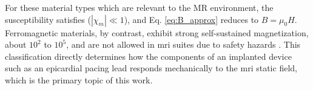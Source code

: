 For these material types which are relevant to the MR environment, the susceptibility satisfies ($|\chi_m| \ll 1$), and Eq. \ref{eq:B_approx} reduces to $B = \mu_0 H$. Ferromagnetic materials, by contrast, exhibit strong self-sustained magnetization, about $10^2$ to $10^5$, and are not allowed in \gls{mri} suites due to safety hazards \cite{Stafford2020}. This classification directly determines how the components of an implanted device such as an epicardial pacing lead responds mechanically to the \gls{mri} static field, which is the primary topic of this work.


